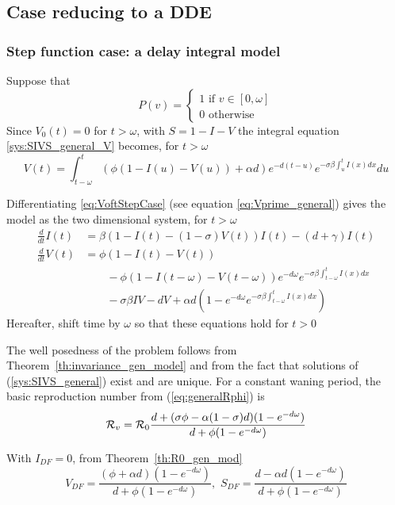 \documentclass[aspectratio=169]{beamer}\usepackage[]{graphicx}\usepackage[]{xcolor}
\begin{document}
\subsection{Case reducing to a DDE}

\begin{frame}\frametitle{Step function case: a delay integral model}
Suppose that
\[ 
P(v)=
\left\{
\begin{array}{l}
1\textrm{ if }v\in[0,\omega] \\
0\textrm{ otherwise} 
\end{array}
\right.
\]
Since $V_0(t)=0$ for $t>\omega$, with $S=1-I-V$ the
integral equation \eqref{sys:SIVS_general_V} becomes, for $t>\omega$
\begin{equation}
  V(t)=\int_{t-\omega}^t(\phi (1-I(u)-V(u))+\alpha d)e^{-d(t-u)}
  e^{-\sigma\beta\int_u^tI(x)dx}du
  \label{eq:VoftStepCase}
\end{equation}
\end{frame}

\begin{frame}
Differentiating \eqref{eq:VoftStepCase} (see equation
\eqref{eq:Vprime_general}) gives the model as the two
dimensional system, for $t>\omega$
\begin{subequations}\label{sys:SIVS_DDE}
\begin{align}
  \frac{d}{dt}I(t) &= 
  \beta(1-I(t)-(1-\sigma)V(t))I(t)-(d+\gamma)I(t) \label{sys:SIVS_DDE_dS} \\
  \frac{d}{dt}V(t) &=
  \phi(1-I(t)-V(t)) \label{sys:SIVS_DDE_dV}\\
  &\qquad-\phi(1-I(t-\omega)-V(t-\omega))e^{-d\omega}
  e^{-\sigma\beta\int_{t-\omega}^t I(x)dx} \nonumber \\
  &\qquad -\sigma\beta IV-dV
  +\alpha d\left(1-e^{-d\omega}e^{-\sigma\beta\int_{t-\omega}^t I(x)dx}
  \right) \nonumber
\end{align}
\end{subequations}
Hereafter, shift time by $\omega$ so that these equations hold for $t>0$
\end{frame}


\begin{frame}
The well posedness of the problem follows from
Theorem~\ref{th:invariance_gen_model} and from the fact that solutions
of (\ref{sys:SIVS_general}) exist and are unique.
For a constant waning period, the basic reproduction number from
(\ref{eq:generalRphi}) is
\begin{equation}
 \mathcal{R}_v = \mathcal{R}_0
 \frac{d+(\sigma\phi-\alpha(1-\sigma)d)
 (1-e^{-d\omega})}{d+\phi(1-e^{-d\omega})}
 \label{eq:Rphi}
\end{equation}


With $I_{DF}=0$, from Theorem~\ref{th:R0_gen_mod}
\begin{equation}
 V_{DF}=\frac{(\phi+\alpha d)(1-e^{-d\omega})}{d+\phi(1-e^{-d\omega})}
,\,\,
S_{DF}=\frac{d-\alpha d(1-e^{-d\omega})}{d+\phi(1-e^{-d\omega})}
 \label{eq:DFE_V}
\end{equation}
\end{frame}
\end{document}

